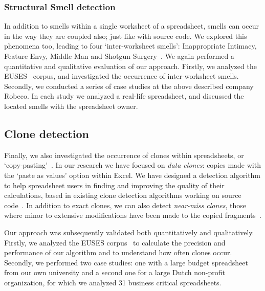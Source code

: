 \documentclass[conference]{IEEEtran}
\begin{document}
\subsubsection{Structural Smell detection}
In addition to smells within a single worksheet of a spreadsheet, smells can occur in the way they are coupled also; just like with source code. We explored this phenomena too, leading to four `inter-worksheet smells': Inappropriate Intimacy, Feature Envy, Middle Man and Shotgun Surgery~\cite{hermans_detecting_2012-1}. We again performed a quantitative and qualitative evaluation of our approach. Firstly, we analyzed the EUSES~\cite{fisher_euses_2005} corpus, and investigated the occurrence of inter-worksheet smells. Secondly, we conducted a series of  case studies at the above described company Robeco. In each study we analyzed a real-life spreadsheet, and discussed the located smells with the spreadsheet owner.  

\subsection{Clone detection}
Finally, we also investigated the occurrence of clones within spreadsheets, or `copy-pasting'~\cite{hermans_data_2013}.  In our research we have focused on \emph{data clones}: copies made with the `paste as values' option within Excel. We have designed a detection algorithm to help spreadsheet users in finding  and improving the quality of their calculations, based in existing clone detection algorithms working on source code~\cite{DBLP:conf/cascon/Johnson93}. In addition to exact clones, we can also detect \emph{near-miss clones}, those where minor to extensive modifications have been made to the copied fragments~\cite{DBLP:conf/icsm/Roy09}.

Our approach was subsequently validated both quantitatively and qualitatively. Firstly, we analyzed the EUSES corpus~\cite{fisher_euses_2005} to calculate the precision and performance of our algorithm and to understand how often clones occur. 
Secondly, we performed two case studies: one with a large budget spreadsheet from our own university and a second one for a large Dutch non-profit organization, for which we analyzed 31 business critical spreadsheets.
\end{document}
